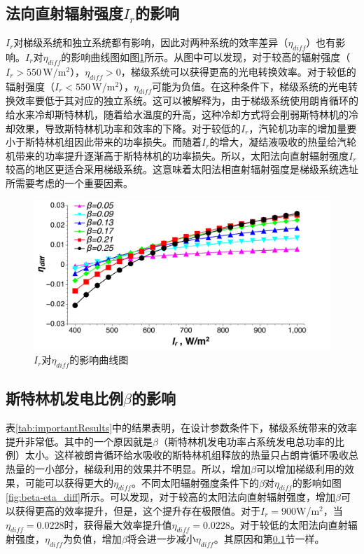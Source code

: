 \subsection{法向直射辐射强度$I_r$的影响}
\label{sec:I_r}

$I_r$对梯级系统和独立系统都有影响，因此对两种系统的效率差异（$\eta_{diff}$）也有影响。$I_r$对$\eta_{diff}$的影响曲线图如图\ref{fig:I_r-eta_diff}所示。从图中可以发现，对于较高的辐射强度（$I_r > 550\,\mathrm{W/m^2}$），$\eta_{diff}>0$，梯级系统可以获得更高的光电转换效率。对于较低的辐射强度（$I_r < 550\,$W/m$^2$），$\eta_{diff}$可能为负值。在这种条件下，梯级系统的光电转换效率要低于其对应的独立系统。这可以被解释为，由于梯级系统使用朗肯循环的给水来冷却斯特林机，随着给水温度的升高，这种冷却方式将会削弱斯特林机的冷却效果，导致斯特林机功率和效率的下降。对于较低的$I_r$，汽轮机功率的增加量要小于斯特林机组因此带来的功率损失。而随着$I_r$的增大，凝结液吸收的热量给汽轮机带来的功率提升逐渐高于斯特林机的功率损失。所以，太阳法向直射辐射强度$I_r$较高的地区更适合采用梯级系统。这意味着太阳法相直射辐射强度是梯级系统选址所需要考虑的一个重要因素。


\noindent \begin{figure}[htbp]
\begin{center}
	\includegraphics[width = 0.8\columnwidth, angle = 0]{fig/I_r-eta_diff}
	\caption{$I_r$对$\eta_{diff}$的影响曲线图}
	\label{fig:I_r-eta_diff}
\end{center}
\end{figure}

\subsection{斯特林机发电比例$\beta$的影响}

表\ref{tab:importantResults}中的结果表明，在设计参数条件下，梯级系统带来的效率提升非常低。其中的一个原因就是$\beta$（斯特林机发电功率占系统发电总功率的比例）太小。这样被朗肯循环给水吸收的斯特林机组释放的热量只占朗肯循环吸收总热量的一小部分，梯级利用的效果并不明显。所以，增加$\beta$可以增加梯级利用的效果，可能可以获得更大的$\eta_{diff}$。不同太阳辐射强度条件下的$\beta$对$\eta_{diff}$的影响如图\ref{fig:beta-eta_diff}所示。可以发现，对于较高的太阳法向直射辐射强度，增加$\beta$可以获得更高的效率提升，但是，这个提升存在极限值。对于$I_r=900$W/m$^2$，当$\eta_{diff}=0.0228$时，获得最大效率提升值$\eta_{diff}=0.0228$。对于较低的太阳法向直射辐射强度，$\eta_{diff}$为负值，增加$\beta$将会进一步减小$\eta_{diff}$。其原因和第\ref{sec:I_r}节一样。

